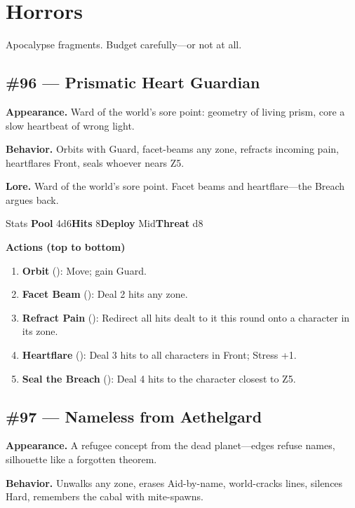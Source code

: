 \section{Horrors}

Apocalypse fragments. Budget carefully---or not at all.

\subsection*{\#96 --- Prismatic Heart Guardian}

\textbf{Appearance.} Ward of the world's sore point: geometry of living prism, core a slow heartbeat of wrong light.

\textbf{Behavior.} Orbits with Guard, facet-beams any zone, refracts incoming pain, heartflares Front, seals whoever nears Z5.

\textbf{Lore.} Ward of the world's sore point. Facet beams and heartflare---the Breach argues back.

\begin{monsterentry}{Stats}
\textbf{Pool} 4d6\quad\textbf{Hits} 8\quad\textbf{Deploy} Mid\quad\textbf{Threat} d8

\textbf{Actions (top to bottom)}
\begin{enumerate}\setlength{\itemsep}{0.15em}\setlength{\parskip}{0pt}
  \item \textbf{Orbit} (\easy): Move; gain Guard.
  \item \textbf{Facet Beam} (\medium): Deal 2 hits any zone.
  \item \textbf{Refract Pain} (\hard): Redirect all hits dealt to it this round onto a character in its zone.
  \item \textbf{Heartflare} (\hard): Deal 3 hits to all characters in Front; Stress +1.
  \item \textbf{Seal the Breach} (\hard): Deal 4 hits to the character closest to Z5.
\end{enumerate}
\end{monsterentry}

\subsection*{\#97 --- Nameless from Aethelgard}

\textbf{Appearance.} A refugee concept from the dead planet---edges refuse names, silhouette like a forgotten theorem.

\textbf{Behavior.} Unwalks any zone, erases Aid-by-name, world-cracks lines, silences Hard, remembers the cabal with mite-spawns.

